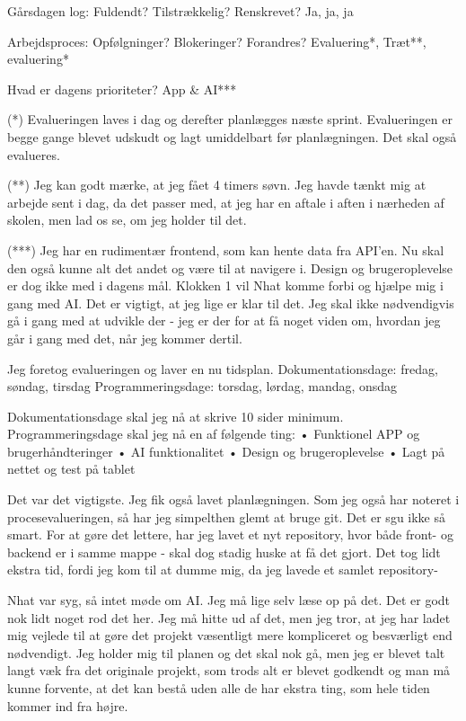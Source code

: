 \documentclass{report}
\begin{document}
Gårsdagen log: Fuldendt? Tilstrækkelig? Renskrevet?
Ja, ja, ja
 
Arbejdsproces: Opfølgninger? Blokeringer? Forandres?
Evaluering*, Træt**, evaluering*
 
Hvad er dagens prioriteter?
App \& AI***
 
(*) Evalueringen laves i dag og derefter planlægges næste sprint. Evalueringen er begge gange blevet udskudt og lagt umiddelbart før planlægningen. Det skal også evalueres.
 
(**) Jeg kan godt mærke, at jeg fået 4 timers søvn. Jeg havde tænkt mig at arbejde sent i dag, da det passer med, at jeg har en aftale i aften i nærheden af skolen, men lad os se, om jeg holder til det.
 
(***) Jeg har en rudimentær frontend, som kan hente data fra API'en. Nu skal den også kunne alt det andet og være til at navigere i. Design og brugeroplevelse er dog ikke med i dagens mål.
Klokken 1 vil Nhat komme forbi og hjælpe mig i gang med AI. Det er vigtigt, at jeg lige er klar til det. Jeg skal ikke nødvendigvis gå i gang med at udvikle der - jeg er der for at få noget viden om, hvordan jeg går i gang med det, når jeg kommer dertil.
 
Jeg foretog evalueringen og laver en nu tidsplan.
Dokumentationsdage: fredag, søndag, tirsdag
Programmeringsdage: torsdag, lørdag, mandag, onsdag
 
Dokumentationsdage skal jeg nå at skrive 10 sider minimum.
Programmeringsdage skal jeg nå en af følgende ting:
•	Funktionel APP og brugerhåndteringer
•	AI funktionalitet
•	Design og brugeroplevelse
•	Lagt på nettet og test på tablet
 
Det var det vigtigste.
Jeg fik også lavet planlægningen.
Som jeg også  har noteret i procesevalueringen, så har jeg simpelthen glemt at bruge git. Det er sgu ikke så smart.
For at gøre det lettere, har jeg lavet et nyt repository, hvor både front- og backend er i samme mappe - skal dog stadig huske at få det gjort.
Det tog lidt ekstra tid, fordi jeg kom til at dumme mig, da jeg lavede et samlet repository-
 
Nhat var syg, så intet møde om AI. Jeg må lige selv læse op på det.
Det er godt nok lidt noget rod det her. Jeg må hitte ud af det, men jeg tror, at jeg har ladet mig vejlede til at gøre det projekt væsentligt mere kompliceret og besværligt end nødvendigt.
Jeg holder mig til planen og det skal nok gå, men jeg er blevet talt langt væk fra det originale projekt, som trods alt er blevet godkendt og man må kunne forvente, at det kan bestå uden alle de har ekstra ting, som hele tiden kommer ind fra højre.
\end{document}
